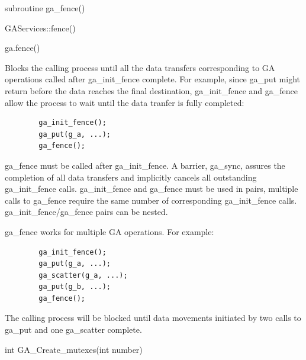 \documentclass[10pt]{article}
\begin{document}
\begin{fapi}
\begin{fcode}
subroutine ga_fence()
\end{fcode}
\end{fapi}

\begin{cxxapi}
\begin{cxxcode}
GAServices::fence()
\end{cxxcode}
\end{cxxapi}

\begin{pyapi}
\begin{pycode}
ga.fence()
\end{pycode}
\end{pyapi}

\ncoll

\begin{desc}

Blocks the calling process until all the data transfers corresponding to GA
operations called after ga_init_fence complete. For example, since ga_put might
return before the data reaches the final destination, ga_init_fence and
ga_fence allow the process to wait until the data tranfer is fully completed:
\begin{verbatim}
        ga_init_fence();
        ga_put(g_a, ...);
        ga_fence();
\end{verbatim}

ga_fence must be called after ga_init_fence. A barrier, ga_sync, assures the
completion of all data transfers and implicitly cancels all outstanding
ga_init_fence calls. ga_init_fence and ga_fence must be used in pairs, multiple
calls to ga_fence require the same number of corresponding ga_init_fence calls.
ga_init_fence/ga_fence pairs can be nested.

ga_fence works for multiple GA operations. For example:
\begin{verbatim}
        ga_init_fence();
        ga_put(g_a, ...);
        ga_scatter(g_a, ...);
        ga_put(g_b, ...);
        ga_fence();
\end{verbatim}

The calling process will be blocked until data movements initiated by two calls
to ga_put and one ga_scatter complete.

\end{desc}



\begin{capi}
\begin{ccode}
int GA_Create_mutexes(int number)
\end{ccode}
\begin{funcargs}
\end{funcargs}
\end{capi}
\end{document}
